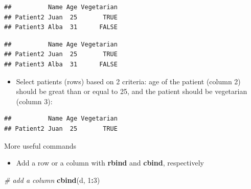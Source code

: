 \documentclass[]{book}
\newenvironment{Shaded}{\begin{snugshade}}{\end{snugshade}}
\newcommand{\CommentTok}[1]{\textcolor[rgb]{0.56,0.35,0.01}{\textit{#1}}}
\newcommand{\DecValTok}[1]{\textcolor[rgb]{0.00,0.00,0.81}{#1}}
\newcommand{\KeywordTok}[1]{\textcolor[rgb]{0.13,0.29,0.53}{\textbf{#1}}}
\newcommand{\NormalTok}[1]{#1}
\newcommand{\OperatorTok}[1]{\textcolor[rgb]{0.81,0.36,0.00}{\textbf{#1}}}
\newcommand{\OtherTok}[1]{\textcolor[rgb]{0.56,0.35,0.01}{#1}}
\newcommand{\StringTok}[1]{\textcolor[rgb]{0.31,0.60,0.02}{#1}}
\providecommand{\tightlist}{%
  \setlength{\itemsep}{0pt}\setlength{\parskip}{0pt}}
\begin{document}
\begin{verbatim}
##          Name Age Vegetarian
## Patient2 Juan  25       TRUE
## Patient3 Alba  31      FALSE
\end{verbatim}

\begin{Shaded}
\end{Shaded}

\begin{verbatim}
##          Name Age Vegetarian
## Patient2 Juan  25       TRUE
## Patient3 Alba  31      FALSE
\end{verbatim}

\begin{itemize}
\tightlist
\item
  Select patients (rows) based on 2 criteria: age of the patient (column 2) should be great than or equal to 25, and the patient should be vegetarian (column 3):
\end{itemize}

\begin{Shaded}
\end{Shaded}

\begin{verbatim}
##          Name Age Vegetarian
## Patient2 Juan  25       TRUE
\end{verbatim}

More useful commands

\begin{itemize}
\tightlist
\item
  Add a row or a column with \textbf{rbind} and \textbf{cbind}, respectively
\end{itemize}

\begin{Shaded}
\begin{Highlighting}[]
\CommentTok{# add a column}
\KeywordTok{cbind}\NormalTok{(d, }\DecValTok{1}\OperatorTok{:}\DecValTok{3}\NormalTok{)}
\end{Highlighting}
\end{Shaded}
\end{document}
